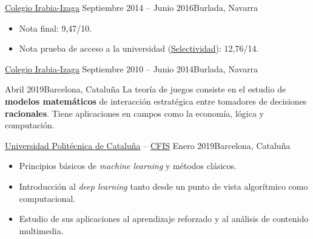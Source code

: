 \documentclass[10pt, a4paper, ragged2e]{../altacv}
\begin{document}
\divider

{\href{https://www.irabia-izaga.org}{Colegio Irabia-Izaga}}
{Septiembre 2014 -- Junio 2016}{Burlada, Navarra}
\begin{itemize}
  \item Nota final: 9,47/10.
  \item Nota prueba de acceso a la universidad
  (\href{https://es.wikipedia.org/wiki/Selectividad_(examen)}{Selectividad}):
  12,76/14.
\end{itemize}

\divider

{\href{https://www.irabia-izaga.org}{Colegio Irabia-Izaga}}
{Septiembre 2010 -- Junio 2014}{Burlada, Navarra}

\medskip
{}

{Abril 2019}{Barcelona, Cataluña}
La teoría de juegos consiste en el estudio de \textbf{modelos matemáticos} de
interacción estratégica entre tomadores de decisiones \textbf{racionales}. Tiene
aplicaciones en campos como la economía, lógica y computación.

\vspace{.1cm}
\divider
\vspace{.15cm}

{\href{https://upc.edu}{Universidad Politécnica de Cataluña} --
  \href{https://cfis.upc.edu}{CFIS}}
{Enero 2019}{Barcelona, Cataluña}
\begin{itemize}
  \item Principios básicos de \textit{machine learning} y métodos clásicos.
  \item Introducción al \textit{deep learning} tanto desde un punto de vista
  algorítmico como computacional.
  \item Estudio de sus aplicaciones al aprendizaje reforzado y al análisis de
  contenido multimedia.
\end{itemize}


\clearpage

\end{document}
